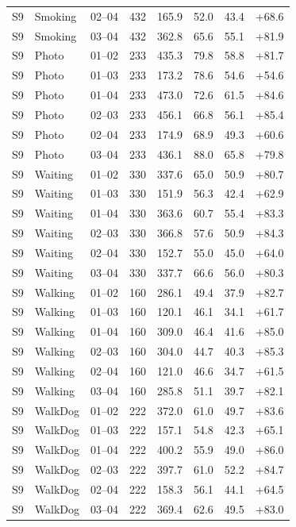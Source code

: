 \begin{center}
{\begin{longtable}{llrrrrrr}
S9 & Smoking & 02--04 & 432 & 165.9 & 52.0 & 43.4 & +68.6 \\
S9 & Smoking & 03--04 & 432 & 362.8 & 65.6 & 55.1 & +81.9 \\
S9 & Photo & 01--02 & 233 & 435.3 & 79.8 & 58.8 & +81.7 \\
S9 & Photo & 01--03 & 233 & 173.2 & 78.6 & 54.6 & +54.6 \\
S9 & Photo & 01--04 & 233 & 473.0 & 72.6 & 61.5 & +84.6 \\
S9 & Photo & 02--03 & 233 & 456.1 & 66.8 & 56.1 & +85.4 \\
S9 & Photo & 02--04 & 233 & 174.9 & 68.9 & 49.3 & +60.6 \\
S9 & Photo & 03--04 & 233 & 436.1 & 88.0 & 65.8 & +79.8 \\
S9 & Waiting & 01--02 & 330 & 337.6 & 65.0 & 50.9 & +80.7 \\
S9 & Waiting & 01--03 & 330 & 151.9 & 56.3 & 42.4 & +62.9 \\
S9 & Waiting & 01--04 & 330 & 363.6 & 60.7 & 55.4 & +83.3 \\
S9 & Waiting & 02--03 & 330 & 366.8 & 57.6 & 50.9 & +84.3 \\
S9 & Waiting & 02--04 & 330 & 152.7 & 55.0 & 45.0 & +64.0 \\
S9 & Waiting & 03--04 & 330 & 337.7 & 66.6 & 56.0 & +80.3 \\
S9 & Walking & 01--02 & 160 & 286.1 & 49.4 & 37.9 & +82.7 \\
S9 & Walking & 01--03 & 160 & 120.1 & 46.1 & 34.1 & +61.7 \\
S9 & Walking & 01--04 & 160 & 309.0 & 46.4 & 41.6 & +85.0 \\
S9 & Walking & 02--03 & 160 & 304.0 & 44.7 & 40.3 & +85.3 \\
S9 & Walking & 02--04 & 160 & 121.0 & 46.6 & 34.7 & +61.5 \\
S9 & Walking & 03--04 & 160 & 285.8 & 51.1 & 39.7 & +82.1 \\
S9 & WalkDog & 01--02 & 222 & 372.0 & 61.0 & 49.7 & +83.6 \\
S9 & WalkDog & 01--03 & 222 & 157.1 & 54.8 & 42.3 & +65.1 \\
S9 & WalkDog & 01--04 & 222 & 400.2 & 55.9 & 49.0 & +86.0 \\
S9 & WalkDog & 02--03 & 222 & 397.7 & 61.0 & 52.2 & +84.7 \\
S9 & WalkDog & 02--04 & 222 & 158.3 & 56.1 & 44.1 & +64.5 \\
S9 & WalkDog & 03--04 & 222 & 369.4 & 62.6 & 49.5 & +83.0 \\

\end{longtable}}
\end{center}
